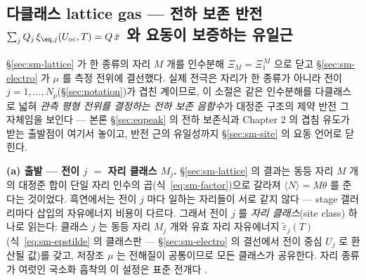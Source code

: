 
\subsection{다클래스 lattice gas --- 전하 보존 반전 $\sum_jQ_j\,\xi_{\eq,j}(U_\mathrm{oc},T)=Q\,\bar x$ 와 요동이 보증하는 유일근}\label{sec:sm-mc}
\S\ref{sec:sm-lattice} 가 한 종류의 자리 $M$ 개를 인수분해 $\Xi_M=\Xi_1^{\,M}$ 으로 닫고
\S\ref{sec:sm-electro} 가 $\mu$ 를 측정 전위에 결선했다. 실제 전극은 자리가 한 종류가 아니라 전이
$j=1,\dots,N_p$(\S\ref{sec:notation})가 겹친 계이므로, 이 소절은 같은 인수분해를 다클래스로 넓혀
\emph{관측 평형 전위를 결정하는 전하 보존 음함수}가 대정준 구조의 제약 반전 그 자체임을 보인다 --- 본론
\S\ref{sec:eqpeak} 의 전하 보존식과 Chapter 2 의 겹침 유도가 받는 출발점이 여기서 놓이고, 반전 근의
유일성까지 \S\ref{sec:sm-site} 의 요동 언어로 닫힌다.

\textbf{(a) 출발 --- 전이 $j$ $=$ 자리 클래스 $M_j$.} \S\ref{sec:sm-lattice} 의 결과는 동등 자리 $M$ 개의
대정준 합이 단일 자리 인수의 곱(식~\eqref{eq:sm-factor})으로 갈라져 $\langle N\rangle=M\theta$ 를 준다는
것이었다. 흑연에서는 전이 $j$ 마다 일하는 자리들이 서로 같지 않다 --- stage 갤러리마다 삽입의 자유에너지
비용이 다르다. 그래서 전이 $j$ 를 \emph{자리 클래스}(site class) 하나로 읽는다: 클래스 $j$ 는 동등 자리
$M_j$ 개와 유효 자리 자유에너지 $\tilde\varepsilon_j(T)$(식~\eqref{eq:sm-epstilde} 의 클래스판 ---
\S\ref{sec:sm-electro} 의 결선에서 전이 중심 $U_j$ 로 환산될 값)를 갖고, 저장조 $\mu$ 는 전해질이
공통이므로 모든 클래스가 공유한다. 자리 종류가 여럿인 국소화 흡착의 이 설정은 표준 전개다 \cite{hill1960}.

